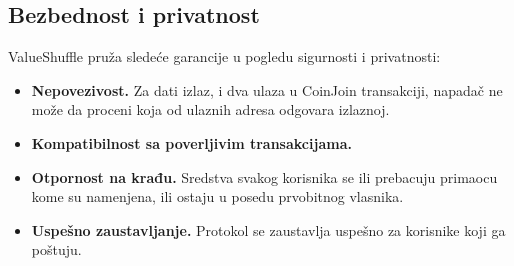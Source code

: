 \documentclass[a4paper]{article}
\begin{document}
\subsection{Bezbednost i privatnost}
ValueShuffle pruža sledeće garancije u pogledu sigurnosti i privatnosti:
\begin{itemize}
	\item \textbf{Nepovezivost.} Za dati izlaz, i dva ulaza u CoinJoin transakciji, napadač ne može da proceni koja od ulaznih adresa odgovara izlaznoj.
	\item \textbf{Kompatibilnost sa poverljivim transakcijama.}
	\item \textbf{Otpornost na krađu.} Sredstva svakog korisnika se ili prebacuju primaocu kome su namenjena, ili ostaju u posedu prvobitnog vlasnika.
	\item \textbf{Uspešno zaustavljanje.} Protokol se zaustavlja uspešno za korisnike koji ga poštuju.
\end{itemize}

\appendix
 

\end{document}
